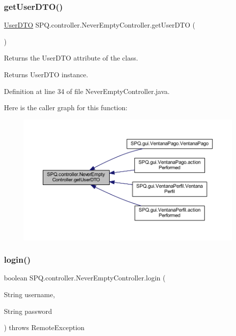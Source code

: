 \subsubsection{\texorpdfstring{get\+User\+D\+T\+O()}{getUserDTO()}}
{\footnotesize\ttfamily \mbox{\hyperlink{class_s_p_q_1_1dto_1_1_user_d_t_o}{User\+D\+TO}} S\+P\+Q.\+controller.\+Never\+Empty\+Controller.\+get\+User\+D\+TO (\begin{DoxyParamCaption}{ }\end{DoxyParamCaption})}

Returns the User\+D\+TO attribute of the class. \begin{DoxyReturn}{Returns}
User\+D\+TO instance. 
\end{DoxyReturn}


Definition at line 34 of file Never\+Empty\+Controller.\+java.

Here is the caller graph for this function\+:\nopagebreak
\begin{figure}[H]
\begin{center}
\leavevmode
\includegraphics[width=350pt]{class_s_p_q_1_1controller_1_1_never_empty_controller_ac6b9878caf6a1f22117adf18c5ca56b5_icgraph}
\end{center}
\end{figure}
\mbox{\label{class_s_p_q_1_1controller_1_1_never_empty_controller_adb8f5dbbfedb5f3c231de53dccc88899}} 
\subsubsection{\texorpdfstring{login()}{login()}}
{\footnotesize\ttfamily boolean S\+P\+Q.\+controller.\+Never\+Empty\+Controller.\+login (\begin{DoxyParamCaption}\item[{String}]{username,  }\item[{String}]{password }\end{DoxyParamCaption}) throws Remote\+Exception}

